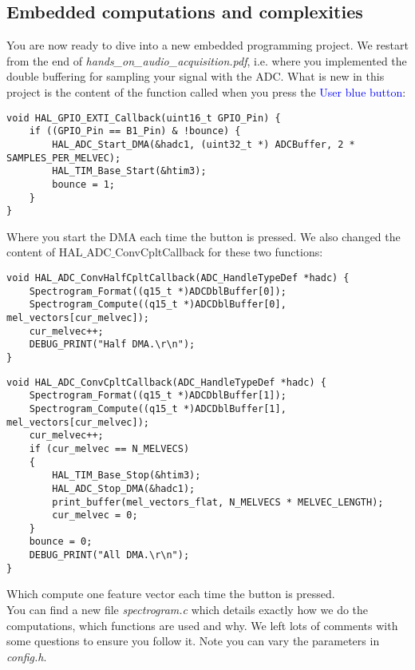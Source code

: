 \subsection{Embedded computations and complexities}
%
You are now ready to dive into a new embedded programming project.
We restart from the end of \emph{hands\_on\_audio\_acquisition.pdf}, i.e. where you implemented the double buffering for sampling your signal with the ADC. What is new in this project is the content of the function called when you press the \textcolor{blue}{User blue button}: \\
%
\begin{lstlisting}
void HAL_GPIO_EXTI_Callback(uint16_t GPIO_Pin) {
	if ((GPIO_Pin == B1_Pin) & !bounce) {
		HAL_ADC_Start_DMA(&hadc1, (uint32_t *) ADCBuffer, 2 * SAMPLES_PER_MELVEC);
		HAL_TIM_Base_Start(&htim3);
		bounce = 1;
	}
}
\end{lstlisting}
%
Where you start the DMA each time the button is pressed. We also changed the content of \newline HAL$\_$ADC$\_$ConvCpltCallback for these two functions:
%
\begin{lstlisting}
void HAL_ADC_ConvHalfCpltCallback(ADC_HandleTypeDef *hadc) {
	Spectrogram_Format((q15_t *)ADCDblBuffer[0]);
	Spectrogram_Compute((q15_t *)ADCDblBuffer[0], mel_vectors[cur_melvec]);
	cur_melvec++;
	DEBUG_PRINT("Half DMA.\r\n");
}
\end{lstlisting}
\begin{lstlisting}
void HAL_ADC_ConvCpltCallback(ADC_HandleTypeDef *hadc) {
	Spectrogram_Format((q15_t *)ADCDblBuffer[1]);
	Spectrogram_Compute((q15_t *)ADCDblBuffer[1], mel_vectors[cur_melvec]);
	cur_melvec++;
	if (cur_melvec == N_MELVECS)
	{
		HAL_TIM_Base_Stop(&htim3);
		HAL_ADC_Stop_DMA(&hadc1);
		print_buffer(mel_vectors_flat, N_MELVECS * MELVEC_LENGTH);
		cur_melvec = 0;
	}
	bounce = 0;
	DEBUG_PRINT("All DMA.\r\n");
}
\end{lstlisting}
%
Which compute one feature vector each time the button is pressed. \\
You can find a new file \emph{spectrogram.c} which details exactly how we do the computations, which functions are used and why. We left lots of comments with some questions to ensure you follow it. Note you can vary the parameters in \emph{config.h}. \\
\\

